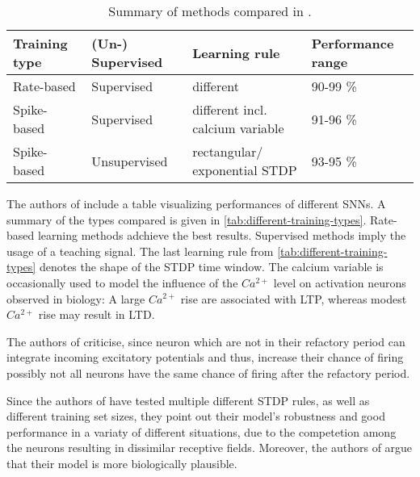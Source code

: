 \begin{table}[]
    \begin{tabular}{|l|l|l|l|}
    \hline
    \textbf{Training type} & \textbf{(Un-) Supervised}    & \textbf{Learning rule}               & \textbf{Performance range} \\ \hline
    Rate-based             & Supervised                   & different                            & 90-99 \%                   \\ \hline
    Spike-based            & Supervised                   & different incl. calcium variable & 91-96 \%                   \\ \hline
    Spike-based            & Unsupervised                 & rectangular/ exponential \ac{STDP}        & 93-95 \%                   \\ \hline
    \end{tabular}
    \caption{Summary of methods compared in \cite{SNN}.}
    \label{tab:different-training-types}
\end{table}

The authors of \cite{SNN} include a table visualizing performances of different \acp{SNN}.
A summary of the types compared is given in \autoref{tab:different-training-types}.
Rate-based learning methods adchieve the best results.
Supervised methods imply the usage of a teaching signal.
The last learning rule from \autoref{tab:different-training-types} denotes the shape of the \ac{STDP} time window.
The calcium variable \cite{STDP_hebbian} is occasionally used to model the influence of the $Ca^{2+}$ level on activation neurons observed in biology:
A large $Ca^{2+}$ rise are associated with \ac{LTP}, whereas modest $Ca^{2+}$ rise may result in \ac{LTD}.

The authors of \cite{SNN} criticise, since neuron which are not in their refactory period can integrate incoming excitatory potentials and thus, 
increase their chance of firing possibly not all neurons have the same chance of firing after the refactory period.

Since the authors of \cite{SNN} have tested multiple different \ac{STDP} rules, as well as different training set sizes, 
they point out their model's robustness and good performance in a variaty of different situations, 
due to the competetion among the neurons resulting in dissimilar receptive fields.
Moreover, the authors of \cite{SNN} argue that their model is more biologically plausible.